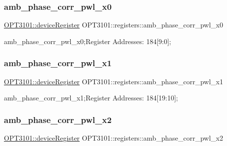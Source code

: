 \subsubsection{\texorpdfstring{amb\+\_\+phase\+\_\+corr\+\_\+pwl\+\_\+x0}{amb\_phase\_corr\_pwl\_x0}}
{\footnotesize\ttfamily \mbox{\hyperlink{class_o_p_t3101_1_1device_register}{O\+P\+T3101\+::device\+Register}} O\+P\+T3101\+::registers\+::amb\+\_\+phase\+\_\+corr\+\_\+pwl\+\_\+x0}



amb\+\_\+phase\+\_\+corr\+\_\+pwl\+\_\+x0;Register Addresses\+: 184\mbox{[}9\+:0\mbox{]}; 

\mbox{\label{class_o_p_t3101_1_1registers_a13de3ddef57db197debf1e4b8977503a}} 
\subsubsection{\texorpdfstring{amb\+\_\+phase\+\_\+corr\+\_\+pwl\+\_\+x1}{amb\_phase\_corr\_pwl\_x1}}
{\footnotesize\ttfamily \mbox{\hyperlink{class_o_p_t3101_1_1device_register}{O\+P\+T3101\+::device\+Register}} O\+P\+T3101\+::registers\+::amb\+\_\+phase\+\_\+corr\+\_\+pwl\+\_\+x1}



amb\+\_\+phase\+\_\+corr\+\_\+pwl\+\_\+x1;Register Addresses\+: 184\mbox{[}19\+:10\mbox{]}; 

\mbox{\label{class_o_p_t3101_1_1registers_a6820d23f7f547d0303e4581a9b2b5a78}} 
\subsubsection{\texorpdfstring{amb\+\_\+phase\+\_\+corr\+\_\+pwl\+\_\+x2}{amb\_phase\_corr\_pwl\_x2}}
{\footnotesize\ttfamily \mbox{\hyperlink{class_o_p_t3101_1_1device_register}{O\+P\+T3101\+::device\+Register}} O\+P\+T3101\+::registers\+::amb\+\_\+phase\+\_\+corr\+\_\+pwl\+\_\+x2}



